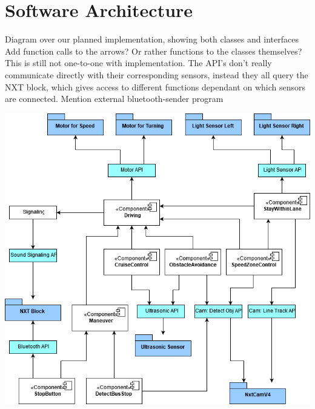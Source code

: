 \section{Software Architecture}

Diagram over our planned implementation, showing both classes and interfaces
Add function calls to the arrows? Or rather functions to the classes themselves?
This is still not one-to-one with implementation. The API's don't really communicate directly with their corresponding sensors, instead they all query the NXT block, which gives access to different functions dependant on which sensors are connected.
Mention external bluetooth-sender program

\includegraphics{Images/Design/architectureClassDiagram.png}




%

